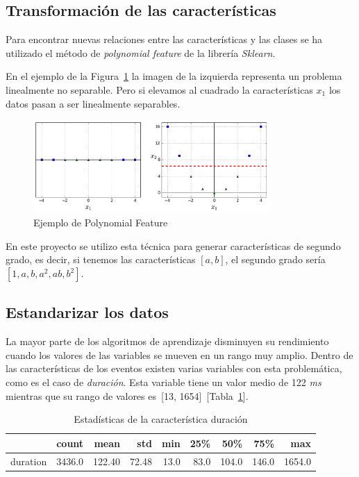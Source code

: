 \subsection{Transformación de las características}

Para encontrar nuevas relaciones entre las características y las clases se ha utilizado el método de \textit{polynomial feature} de la librería \textit{Sklearn}.

En el ejemplo de la Figura~\ref{fig:polynomial} la imagen de la izquierda representa un problema linealmente no separable. Pero si elevamos al cuadrado la características $x_1$ los datos pasan a ser linealmente separables.

\begin{figure}[h]
    \centering
    \includegraphics[width=0.8\textwidth, keepaspectratio]{imaxes/polinomial.png}
    \caption{Ejemplo de Polynomial Feature}
    \label{fig:polynomial}
\end{figure}

En este proyecto se utilizo esta técnica para generar características de segundo grado, es decir, si tenemos las características $[a, b]$, el segundo grado sería $[1, a, b, a^2, ab, b^2]$.

\subsection{Estandarizar los datos}
La mayor parte de los algoritmos de aprendizaje disminuyen su rendimiento cuando los valores de las variables se mueven en un rango muy amplio. Dentro de las características de los eventos existen varias variables con esta problemática, como es el caso de \textit{duración}. Esta variable tiene un valor medio de 122 \textit{ms} mientras que su rango de valores es~[13, 1654]~[Tabla~\ref{tab:scaler_example}].

\begin{table}[H]
    \centering
    \begin{tabular}{lrrrrrrrr}
        \toprule
        {} &   count &        mean &        std &   min &   25\% &    50\% &    75\% &     max \\
        \midrule
        duration &  3436.0 &  122.40 &  72.48 &  13.0 &  83.0 &  104.0 &  146.0 &  1654.0 \\
        \bottomrule
    \end{tabular}
    \caption{Estadísticas de la característica duración}
    \label{tab:scaler_example}
 \end{table}
 
